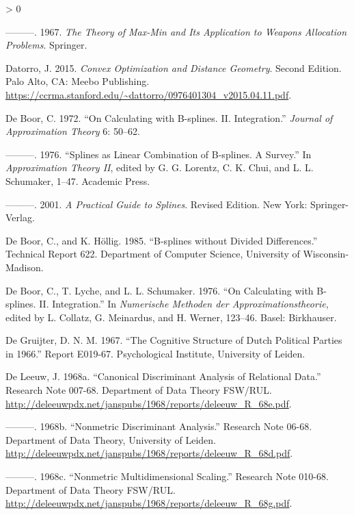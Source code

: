 \documentclass[
  12pt,
]{book}
\newlength{\cslhangindent}
\newenvironment{CSLReferences}[2] %
 {%
  \setlength{\parindent}{0pt}
  \ifodd #1 \everypar{\setlength{\hangindent}{\cslhangindent}}\ignorespaces\fi
  \ifnum #2 > 0
  \setlength{\parskip}{#2\baselineskip}
  \fi
 }%
 {}
\theoremstyle{definition}
\theoremstyle{definition}
\theoremstyle{definition}
\theoremstyle{definition}
\theoremstyle{remark}
\begin{document}
\begin{CSLReferences}{1}{0}
\leavevmode\hypertarget{ref-danskin_67}{}%
---------. 1967. \emph{The Theory of Max-Min and Its Application to Weapons Allocation Problems}. Springer.

\leavevmode\hypertarget{ref-datorro_15}{}%
Datorro, J. 2015. \emph{Convex Optimization and Distance Geometry}. Second Edition. Palo Alto, CA: Meebo Publishing. \url{https://ccrma.stanford.edu/~dattorro/0976401304_v2015.04.11.pdf}.

\leavevmode\hypertarget{ref-deboor_72}{}%
De Boor, C. 1972. {``{On Calculating with B-splines. II. Integration}.''} \emph{Journal of Approximation Theory} 6: 50--62.

\leavevmode\hypertarget{ref-deboor_76}{}%
---------. 1976. {``{Splines as Linear Combination of B-splines. A Survey.}''} In \emph{{Approximation Theory II}}, edited by G. G. Lorentz, C. K. Chui, and L. L. Schumaker, 1--47. Academic Press.

\leavevmode\hypertarget{ref-deboor_01}{}%
---------. 2001. \emph{A Practical Guide to Splines}. Revised Edition. New York: Springer-Verlag.

\leavevmode\hypertarget{ref-deboor_hollig_85}{}%
De Boor, C., and K. Höllig. 1985. {``{B-splines without Divided Differences}.''} Technical Report 622. Department of Computer Science, University of Wisconsin-Madison.

\leavevmode\hypertarget{ref-deboor_lyche_schumaker_76}{}%
De Boor, C., T. Lyche, and L. L. Schumaker. 1976. {``{On Calculating with B-splines. II. Integration}.''} In \emph{{Numerische Methoden der Approximationstheorie}}, edited by L. Collatz, G. Meinardus, and H. Werner, 123--46. Basel: Birkhauser.

\leavevmode\hypertarget{ref-degruijter_67}{}%
De Gruijter, D. N. M. 1967. {``{The Cognitive Structure of Dutch Political Parties in 1966}.''} Report E019-67. Psychological Institute, University of Leiden.

\leavevmode\hypertarget{ref-deleeuw_R_68e}{}%
De Leeuw, J. 1968a. {``Canonical Discriminant Analysis of Relational Data.''} Research Note 007-68. Department of Data Theory FSW/RUL. \url{http://deleeuwpdx.net/janspubs/1968/reports/deleeuw_R_68e.pdf}.

\leavevmode\hypertarget{ref-deleeuw_R_68d}{}%
---------. 1968b. {``Nonmetric Discriminant Analysis.''} Research Note 06-68. Department of Data Theory, University of Leiden. \url{http://deleeuwpdx.net/janspubs/1968/reports/deleeuw_R_68d.pdf}.

\leavevmode\hypertarget{ref-deleeuw_R_68g}{}%
---------. 1968c. {``Nonmetric Multidimensional Scaling.''} Research Note 010-68. Department of Data Theory FSW/RUL. \url{http://deleeuwpdx.net/janspubs/1968/reports/deleeuw_R_68g.pdf}.


\end{CSLReferences}
\end{document}
